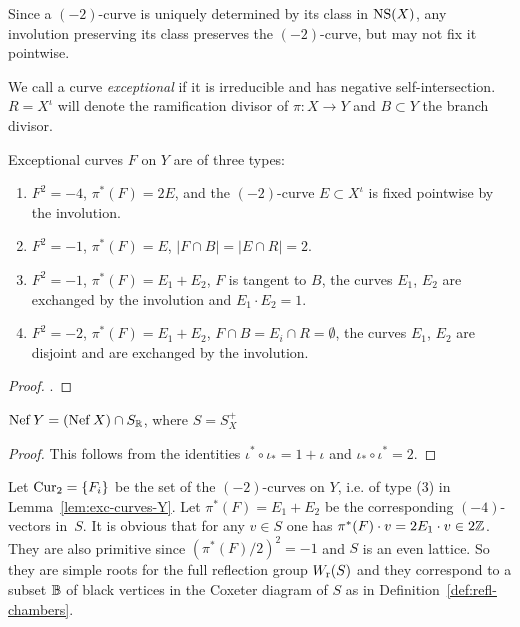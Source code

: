 \documentclass{amsart}
\begin{document}
Since a $(-2)$-curve is uniquely determined by its class in $\operatorname{NS}(X)$,
any involution preserving its class preserves the $(-2)$-curve, but may
not fix it pointwise.

We call a curve \emph{exceptional} if it is irreducible and has
negative self-intersection. $R=X^\iota$ will denote the ramification
divisor of $\pi\colon X\to Y$ and $B\subset Y$ the branch divisor. 

\begin{lemma}\label{lem:exc-curves-Y}
  Exceptional curves $F$ on $Y$ are of three types:
  \begin{enumerate}
  \item[(1)] $F^2=-4$, $\pi^*(F) = 2E$, and the $(-2)$-curve
    $E\subset X^\iota$ is fixed pointwise by the involution.
  \item[(2a)] $F^2=-1$, $\pi^*(F)=E$, $|F\cap B| = |E\cap R|=2$.
  \item[(2b)] $F^2=-1$, $\pi^*(F)=E_1+E_2$, $F$ is tangent to $B$, the
    curves $E_1$, $E_2$ are exchanged by the involution and
    $E_1\cdot E_2=1$.
  \item[(3)] $F^2=-2$, $\pi^*(F)=E_1+E_2$,
    $F\cap B = E_i\cap R=\emptyset$, the curves $E_1$, $E_2$ are
    disjoint and are exchanged by the involution.
  \end{enumerate}
\end{lemma}
\begin{proof}
  \cite[Sec.~2.4]{alexeev2006del-pezzo}.
\end{proof}

\begin{lemma}\label{lem:nef-Y-trivial}
  $\operatorname{Nef} Y = (\operatorname{Nef} X)\cap S_{\mathbb R}$, where $S= S_X^+$
\end{lemma}
\begin{proof}
  This follows from the identities $\iota^*\circ\iota_* = 1+\iota$
  and $\iota_*\circ\iota^* = 2$. 
\end{proof}


\begin{definition}
  Let $\operatorname{Cur}_2=\{F_i\}$ be the set of the $(-2)$-curves on $Y$, i.e. of
  type (3) in Lemma~\ref{lem:exc-curves-Y}. Let $\pi^*(F)=E_1+E_2$ be
  the corresponding $(-4)$-vectors in~$S$. It is obvious that for any
  $v\in S$ one has $\pi^*(F)\cdot v = 2E_1\cdot v\in 2{\mathbb Z}$. They are
  also primitive since $(\pi^*(F)/2)^2=-1$ and $S$ is an even
  lattice. So they are simple roots for the full reflection group
  $W_{\rm r}(S)$ and they correspond to a subset ${\mathbb B}$ of black vertices in
  the Coxeter diagram of $S$ as in Definition~\ref{def:refl-chambers}.
\end{definition}
\end{document}
